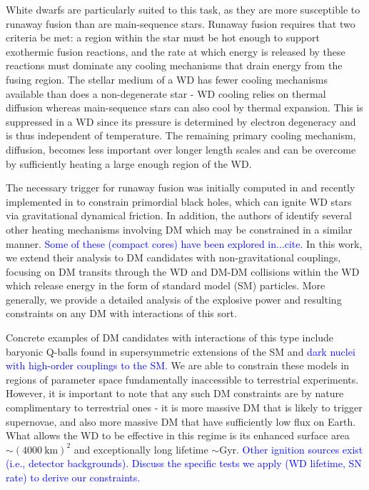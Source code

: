 \documentclass[twocolumn,showpacs,preprintnumbers,amsmath,amssymb,prd]{revtex4}
\begin{document}
White dwarfs are particularly suited to this task, as they are more susceptible to runaway fusion than are main-sequence stars. Runaway fusion requires that two criteria be met: a region within the star must be hot enough to support exothermic fusion reactions, and the rate at which energy is released by these reactions must dominate any cooling mechanisms that drain energy from the fusing region.  The stellar medium of a WD has fewer cooling mechanisms available than does a non-degenerate star - WD cooling relies on thermal diffusion whereas main-sequence stars can also cool by thermal expansion.  This is suppressed in a WD since its pressure is determined by electron degeneracy and is thus independent of temperature. The remaining primary cooling mechanism, diffusion, becomes less important over longer length scales and can be overcome by sufficiently heating a large enough region of the WD.

The necessary trigger for runaway fusion was initially computed in \cite{Woosley} and recently implemented in \cite{Graham:2015apa} to constrain primordial black holes, which can ignite WD stars via gravitational dynamical friction.  In addition, the authors of \cite{Graham:2015apa} identify several other heating mechanisms involving DM which may be constrained in a similar manner. \textcolor{blue}{Some of these (compact cores) have been explored in...cite.}  In this work, we extend their analysis to DM candidates with non-gravitational couplings, focusing on DM transits through the WD and DM-DM collisions within the WD which release energy in the form of standard model (SM) particles. More generally, we provide a detailed analysis of the explosive power and resulting constraints on any DM with interactions of this sort.

Concrete examples of DM candidates with interactions of this type include baryonic Q-balls found in supersymmetric extensions of the SM and \textcolor{blue}{dark nuclei with high-order couplings to the SM.} We are able to constrain these models in regions of parameter space fundamentally inaccessible to terrestrial experiments. However, it is important to note that any such DM constraints are by nature complimentary to terrestrial ones - it is more massive DM that is likely to trigger supernovae, and also more massive DM that have sufficiently low flux on Earth. What allows the WD to be effective in this regime is its enhanced surface area $\sim (4000 ~\text{km})^2$ and exceptionally long lifetime $\sim \text{Gyr}$.
\textcolor{blue}{Other ignition sources exist (i.e., detector backgrounds). Discuss the specific tests we apply (WD lifetime, SN rate) to derive our constraints.}
\end{document}
